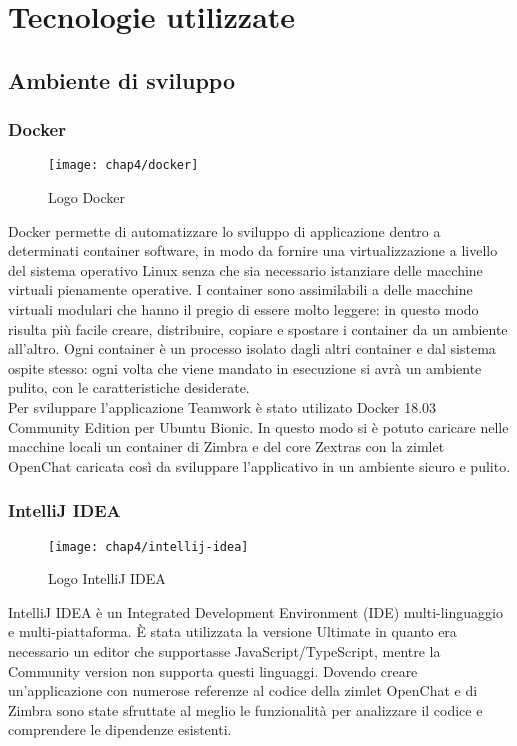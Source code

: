 
\chapter{Tecnologie utilizzate}\label{chap:tec}
\section{Ambiente di sviluppo}
\subsection{Docker}
	\begin{figure}[H] 
		\centering
		\texttt{[image: chap4/docker]}
		\caption{Logo Docker}
	\end{figure}
Docker permette di automatizzare lo sviluppo di applicazione dentro a 
determinati container software, 
in modo da fornire una virtualizzazione a livello del sistema operativo Linux
senza che sia necessario istanziare delle macchine virtuali pienamente 
operative.
I container sono assimilabili a delle macchine virtuali modulari che hanno il 
pregio di essere molto 
leggere: in questo modo risulta più facile  creare, distribuire, copiare e spostare 
i container da un 
ambiente all'altro.
Ogni container è un processo isolato dagli altri container e dal sistema ospite stesso:  ogni volta che 
viene mandato in esecuzione si avrà un ambiente pulito, con le caratteristiche desiderate. \\
Per sviluppare l'applicazione Teamwork è stato utilizato Docker 18.03 Community Edition per Ubuntu 
Bionic. In questo modo si è potuto caricare nelle macchine locali un container di Zimbra e del core 
Zextras con la zimlet OpenChat caricata così da sviluppare l'applicativo in un ambiente sicuro e pulito.

\subsection{IntelliJ IDEA} \label{subsec:IntelliJ}
	\begin{figure}[H] 
		\centering
		\texttt{[image: chap4/intellij-idea]}
		\caption{Logo IntelliJ IDEA}
	\end{figure}
IntelliJ IDEA è un Integrated Development Environment (IDE) multi-linguaggio e 
multi-piattaforma. 
È stata utilizzata la versione Ultimate in quanto era necessario un editor che 
supportasse  
JavaScript/TypeScript, mentre la Community version non supporta questi 
linguaggi. 
Dovendo creare un'applicazione con numerose referenze al codice della zimlet 
OpenChat e di Zimbra 
sono state sfruttate al meglio le funzionalità per analizzare il codice e 
comprendere le 
dipendenze esistenti.

